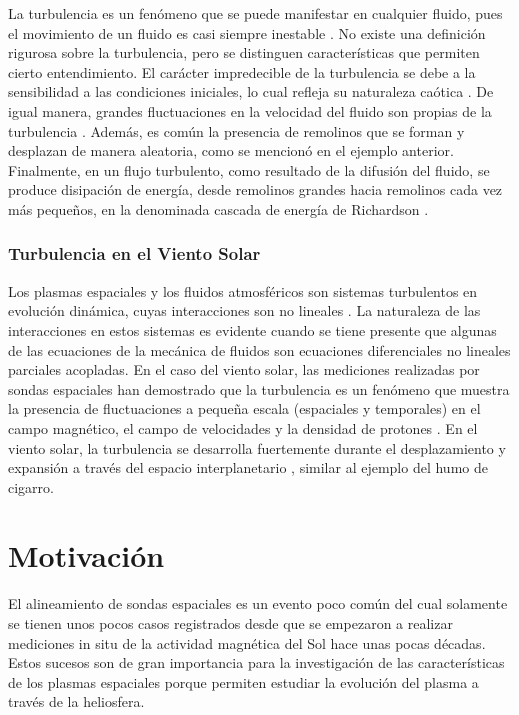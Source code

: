 La turbulencia es un fenómeno que se puede manifestar en cualquier fluido, pues el movimiento de un fluido es casi siempre inestable \cite{davidson_turbulence_2015}. No existe una definición rigurosa sobre la turbulencia, pero se distinguen características que permiten cierto entendimiento. El carácter impredecible de la turbulencia se debe a la sensibilidad a las condiciones iniciales, lo cual refleja su naturaleza caótica \cite{davidson_turbulence_2015}. De igual manera, grandes fluctuaciones en la velocidad del fluido son propias de la turbulencia \cite{davidson_turbulence_2015, Cengel}. Además, es común la presencia de remolinos que se forman y desplazan de manera aleatoria, como se mencionó en el ejemplo anterior. Finalmente, en un flujo turbulento, como resultado de la difusión del fluido, se produce disipación de energía, desde remolinos grandes hacia remolinos cada vez más pequeños, en la denominada cascada de energía de Richardson \cite{davidson_turbulence_2015, bruno_turbulence_2016}. 

\subsubsection{Turbulencia en el Viento Solar}

\noindent Los plasmas espaciales y los fluidos atmosféricos son sistemas turbulentos en evolución dinámica, cuyas interacciones son no lineales \cite{Kamide}. La naturaleza de las interacciones en estos sistemas es evidente cuando se tiene presente que algunas de las ecuaciones de la mecánica de fluidos son ecuaciones diferenciales no lineales parciales acopladas. En el caso del viento solar, las mediciones realizadas por sondas espaciales han demostrado que la turbulencia es un fenómeno que muestra la presencia de fluctuaciones a pequeña escala (espaciales y temporales) en el campo magnético, el campo de velocidades y la densidad de protones \cite{bruno_turbulence_2016, sorriso-valvo_intermittency_1999, hnat_intermittency_2003}. En el viento solar, la turbulencia se desarrolla fuertemente durante el desplazamiento y expansión a través del espacio interplanetario \cite{coleman_turbulence_1968, bruno_solar_2013, bruno_turbulence_2016}, similar al ejemplo del humo de cigarro.

\section{Motivación}

\noindent El alineamiento de sondas espaciales es un evento poco común del cual solamente se tienen unos pocos casos registrados \cite{damicis_radial_2010, bruno_spectral_2014, bruno_radial_2014, schwartz_radial_1983, zank_theory_2017, telloni_evolution_2021} desde que se empezaron a realizar mediciones in situ de la actividad magnética del Sol hace unas pocas décadas. Estos sucesos son de gran importancia para la investigación de las características de los plasmas espaciales porque permiten estudiar la evolución del plasma a través de la heliosfera.

